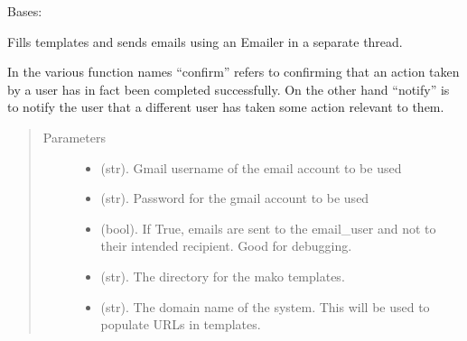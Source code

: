 \documentclass[letterpaper,10pt,english]{sphinxmanual}
\begin{document}
\begin{fulllineitems}
\label{\detokenize{apidoc/utdesign_procurement:utdesign_procurement.emailer.EmailHandler}}
Bases: 

Fills templates and sends emails using an Emailer in a separate thread.

In the various function names “confirm” refers to confirming that an
action taken by a user has in fact been completed successfully.
On the other hand “notify” is to notify the user that a different
user has taken some action relevant to them.
\begin{quote}\begin{description}
\item[{Parameters}] \leavevmode\begin{itemize}
\item {} 
 \textendash{} (str). Gmail username of the email account to be used

\item {} 
 \textendash{} (str). Password for the gmail account to be used

\item {} 
 \textendash{} (bool). If True, emails are sent to the email\_user
and not to their intended recipient. Good for debugging.

\item {} 
 \textendash{} (str). The directory for the mako templates.

\item {} 
 \textendash{} (str). The domain name of the system. This will be used
to populate URLs in templates.

\end{itemize}

\end{description}\end{quote}


\end{fulllineitems}
\end{document}
